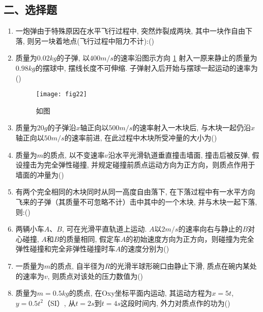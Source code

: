 \subsection*{二、选择题}
\begin{enumerate}
    \item 一炮弹由于特殊原因在水平飞行过程中, 突然炸裂成两块, 其中一块作自由下落, 则另一块着地点(飞行过程中阻力不计):(\hspace{1pc})     
    \item 质量为$0.02kg$的子弹, 以$400 m/s$的速率沿图示方向 \ref{fig:22} 射入一原来静止的质量为$0.98kg$的摆球中, 摆线长度不可伸缩. 子弹射入后开始与摆球一起运动的速率为(\hspace{1pc})
    \begin{figure}[H]
        \centering
        \texttt{[image: fig22]}
            \caption{如图}\label{fig:22}
    \end{figure}
    \item 质量为$20 g$的子弹沿$x$轴正向以$500 m/s$的速率射入一木块后, 与木块一起仍沿$x$轴正向以$50 m/s$的速率前进, 在此过程中木块所受冲量的大小为(\hspace{1pc})                                                        
    \item 质量为$m$的质点, 以不变速率$v$沿水平光滑轨道垂直撞击墙面, 撞击后被反弹, 假设撞击为完全弹性碰撞, 并规定碰撞前质点运动方向为正方向，则质点作用于墙面的冲量为(\hspace{1pc})

    \item 有两个完全相同的木块同时从同一高度自由落下, 在下落过程中有一水平方向飞来的子弹（其质量不可忽略不计）击中其中的一个木块, 并与木块一起下落, 则:(\hspace{1pc})  
   
   \item  两辆小车$A$、$B$, 可在光滑平直轨道上运动. $A$以$2 m/s$的速率向右与静止的$B$对心碰撞, $A$和$B$的质量相同, 假定车$A$的初始速度方向为正方向，则碰撞为完全弹性碰撞和完全非弹性碰撞时车$A$的速度分别为(\hspace{1pc})                         
    \item 一质量为$m$的质点, 自半径为$R$的光滑半球形碗口由静止下滑, 质点在碗内某处的速率为$v$, 则质点对该处的压力数值为(\hspace{1pc})                
    \item 质量为$m=0.5kg$的质点, 在Oxy坐标平面内运动, 其运动方程为$x=5t$, $y=0.5t^2$（SI）, 从$t=2s$到$t=4s$这段时间内, 外力对质点作的功为(\hspace{1pc})


\end{enumerate}
